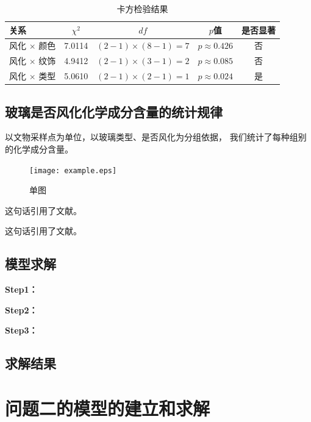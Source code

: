 \documentclass[withoutpreface,bwprint]{cumcmthesis}
\begin{document}
\begin{table}[htbp]
    \centering
    \caption{卡方检验结果}
    \begin{tabular}{lcccc}
        \toprule
        关系 & $\chi^2$ & $df$ & $p$值 &  是否显著 \\
        \midrule
        风化 $\times$ 颜色 & 7.0114 & $(2-1)\times(8-1)=7$ & $p \approx 0.426$ & 否 \\
        风化 $\times$ 纹饰 & 4.9412 & $(2-1)\times(3-1)=2$ & $p \approx 0.085$ & 否 \\
        风化 $\times$ 类型 & 5.0610 & $(2-1)\times(2-1)=1$ & $p \approx 0.024$ & 是 \\
        \bottomrule
    \end{tabular}
\end{table}

\subsection{玻璃是否风化化学成分含量的统计规律}

以文物采样点为单位，以玻璃类型、是否风化为分组依据，
我们统计了每种组别的化学成分含量。



\begin{figure}[ht]
\centering
\texttt{[image: example.eps]}
\caption{单图}
\label{fig:单图}
\end{figure}

这句话引用了文献\cite{司守奎2011数学建模算法与应用}。

这句话引用了文献。

\subsection{模型求解}

\textbf{Step1：} 

\textbf{Step2：} 

\textbf{Step3：} 

\subsection{求解结果}



\section{问题二的模型的建立和求解}
\end{document}
